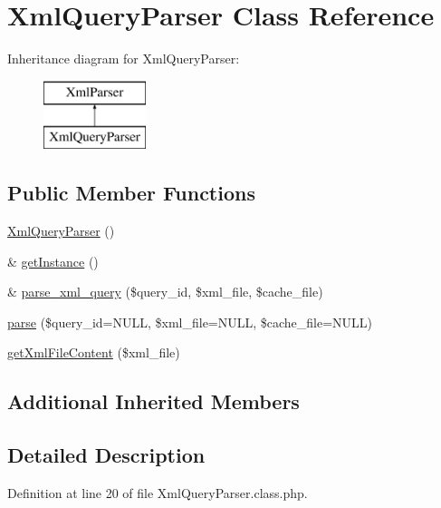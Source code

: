 \hypertarget{classXmlQueryParser}{}\section{Xml\+Query\+Parser Class Reference}
\label{classXmlQueryParser}
Inheritance diagram for Xml\+Query\+Parser\+:\begin{figure}[H]
\begin{center}
\leavevmode
\includegraphics[height=2.000000cm]{classXmlQueryParser}
\end{center}
\end{figure}
\subsection*{Public Member Functions}
\begin{DoxyCompactItemize}
\item 
\hyperlink{classXmlQueryParser_ac90d36a02cc74ea88d162d6fa0a44e21}{Xml\+Query\+Parser} ()
\item 
\& \hyperlink{classXmlQueryParser_af6558a14a48242f4082d4b05e24b66be}{get\+Instance} ()
\item 
\& \hyperlink{classXmlQueryParser_ada0b24aac541d493f8344a74776664cb}{parse\+\_\+xml\+\_\+query} (\$query\+\_\+id, \$xml\+\_\+file, \$cache\+\_\+file)
\item 
\hyperlink{classXmlQueryParser_a73bf00a88a856f3acb99dba3f554aeb2}{parse} (\$query\+\_\+id=N\+U\+LL, \$xml\+\_\+file=N\+U\+LL, \$cache\+\_\+file=N\+U\+LL)
\item 
\hyperlink{classXmlQueryParser_aed43fc81b117c0d90948cb70cdad6280}{get\+Xml\+File\+Content} (\$xml\+\_\+file)
\end{DoxyCompactItemize}
\subsection*{Additional Inherited Members}


\subsection{Detailed Description}


Definition at line 20 of file Xml\+Query\+Parser.\+class.\+php.



